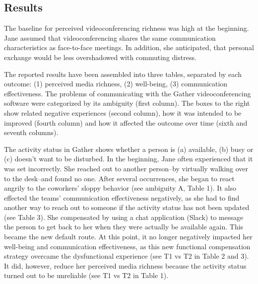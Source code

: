 \documentclass[man]{apa7}
\begin{document}
\subsection{Results}

The baseline for perceived videoconferencing richness was high at the beginning. Jane assumed that videoconferencing shares the same communication characteristics as face-to-face meetings. In addition, she anticipated, that personal exchange would be less overshadowed with commuting distress.

The reported results have been assembled into three tables, separated by each outcome: (1) perceived media richness, (2) well-being, (3) communication effectiveness. The problems of communicating with the Gather videoconferencing software were categorized by its ambiguity (first column). The boxes to the right show related negative experiences (second column), how it was intended to be improved (fourth column) and how it affected the outcome over time (sixth and seventh columns).

The activity status in Gather shows whether a person is (a) available, (b) busy or (c) doesn't want to be disturbed. In the beginning, Jane often experienced that it was set incorrectly. She reached out to another person–by virtually walking over to the desk–and found no one. After several occurrences, she began to react angrily to the coworkers' sloppy behavior (see ambiguity A, Table 1). It also effected the teams' communication effectiveness negatively, as she had to find another way to reach out to someone if the activity status has not been updated (see Table 3). She compensated by using a chat application (Slack) to message the person to get back to her when they were actually be available again. This became the new default route. At this point, it no longer negatively impacted her well-being and communication effectiveness, as this new functional compensation strategy overcame the dysfunctional experience (see T1 vs T2 in Table 2 and 3). It did, however, reduce her perceived media richness because the activity status turned out to be unreliable (see T1 vs T2 in Table 1). 
\end{document}
